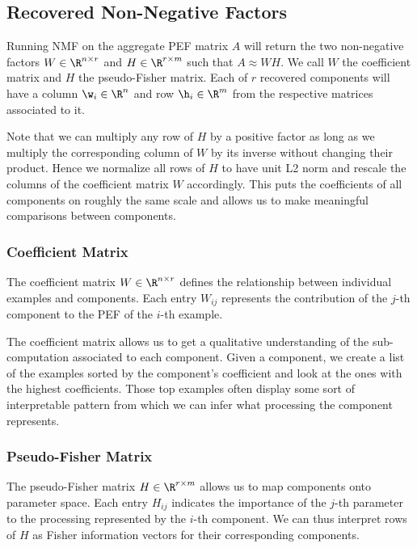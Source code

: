 \documentclass[dvipsnames]{article}
\begin{document}
\subsection{Recovered Non-Negative Factors}
Running NMF on the aggregate PEF matrix $A$ will return the two non-negative factors $W \in \R^{n\times r}$ and $H \in \R^{r\times m}$ such that $A \approx WH$.
We call $W$ the coefficient matrix and $H$ the pseudo-Fisher matrix.
Each of $r$ recovered components will have a column $\w_i \in \R^n$ and row $\h_i \in \R^m$ from the respective matrices associated to it.


Note that we can multiply any row of $H$ by a positive factor as long as we multiply the corresponding column of $W$ by its inverse without changing their product.
Hence we normalize all rows of $H$ to have unit L2 norm and rescale the columns of the coefficient matrix $W$ accordingly.
This puts the coefficients of all components on roughly the same scale and allows us to make meaningful comparisons between components.

\subsubsection{Coefficient Matrix}
The coefficient matrix $W \in \R^{n\times r}$ defines the relationship between individual examples and components.
Each entry $W_{ij}$ represents the contribution of the $j$-th component to the PEF of the $i$-th example.

The coefficient matrix allows us to get a qualitative understanding of the sub-computation associated to each component.
Given a component, we create a list of the examples sorted by the component's coefficient and look at the ones with the highest coefficients.
Those top examples often display some sort of interpretable pattern from which we can infer what processing the component represents.



\subsubsection{Pseudo-Fisher Matrix}
The pseudo-Fisher matrix $H \in \R^{r\times m}$ allows us to map components onto parameter space.
Each entry $H_{ij}$ indicates the importance of the $j$-th parameter to the processing represented by the $i$-th component.
We can thus interpret rows of $H$ as Fisher information vectors for their corresponding components.
\end{document}
